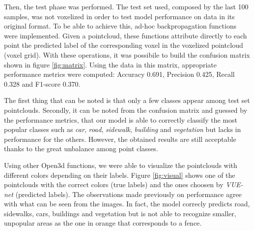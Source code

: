 Then, the test phase was performed. The test set used, composed by the last 100 samples, 
was not voxelized in order to test model performance on data in its original format.
To be able to achieve this, ad-hoc backpropagation functions were implemented.
Given a pointcloud, these functions attribute directly to each point the predicted label of the
corresponding voxel in the voxelized pointcloud (voxel grid).
With these operations, it was possibile to build the confusion matrix shown in figure \ref{fig:matrix}.
Using the data in this matrix, appropriate performance metrics were computed: Accuracy 0.691,
Precision 0.425, Recall 0.328 and F1-score 0.370.  

The first thing that can be noted is that only a few classes appear among test set pointclouds.
Secondly, it can be noted from the confusion matrix and guessed by the performance metrics, 
that our model is able to correctly classify the most popular classes such as \textit{car},
\textit{road}, \textit{sidewalk}, \textit{building} and \textit{vegetation} 
but lacks in performance for the others. 
However, the obtained results are still acceptable thanks to the great unbalance among point classes.

Using other Open3d functions, we were able to visualize the pointclouds with different colors depending
on their labels. Figure \ref{fig:visual} shows one of the pointclouds with the
correct colors (true labels) and the ones choosen by \textit{VUE-net} (predicted labels).
The observations made previously on performance agree with what can be seen from the images.
In fact, the model correcly predicts road, sidewalks, cars, buildings and vegetation but is not
able to recognize smaller, unpopular areas as the one in orange that corresponds to a fence.